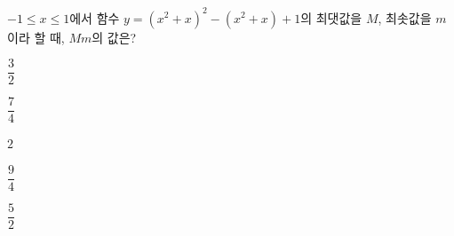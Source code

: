 $-1\le x\le 1$에서 함수 $y=(x^2+x)^2-(x^2+x)+1$의 최댓값을 $M$, 최솟값을 $m$이라 할 때, $Mm$의 값은?
\begin{choices32}{\rule[-3ex]{0pt}{8ex}$\dfrac{3}{2}$}{\rule[-3ex]{0pt}{8ex}$\dfrac{7}{4}$}{\rule[-3ex]{0pt}{8ex}$2$}{\rule[-3ex]{0pt}{8ex}$\dfrac{9}{4}$}{\rule[-3ex]{0pt}{8ex}$\dfrac{5}{2}$}\end{choices32}
